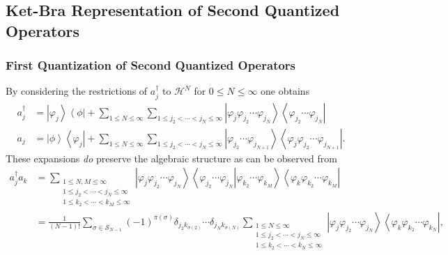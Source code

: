 \documentclass[aps,preprint]{revtex4}%
\begin{document}
\subsection{Ket-Bra Representation of Second Quantized Operators}

\subsubsection{First Quantization of Second Quantized Operators}

\bigskip By considering the restrictions of $a_{j}^{\dagger}$ to
$\mathcal{H}^{N}$ for $0\leq N\leq\infty$ one obtains%
\begin{align}
a_{j}^{\dagger}  &  =\left\vert \varphi_{j}\right\rangle \left\langle
\phi\right\vert +\sum_{1\leq N\leq\infty}\sum_{1\leq j_{2}<\cdots<j_{N}%
\leq\infty}\left\vert \varphi_{j}\varphi_{j_{2}}\cdots\varphi_{j_{N}%
}\right\rangle \left\langle \varphi_{j_{2}}\cdots\varphi_{j_{N}}\right\vert
\nonumber\\
a_{j}  &  =\left\vert \phi\right\rangle \left\langle \varphi_{j}\right\vert
+\sum_{1\leq N\leq\infty}\sum_{1\leq j_{2}<\cdots<j_{N}\leq\infty}\left\vert
\varphi_{j_{2}}\cdots\varphi_{j_{N+1}}\right\rangle \left\langle \varphi
_{j}\varphi_{j_{2}}\cdots\varphi_{j_{N+1}}\right\vert . \label{FQ}%
\end{align}
These expansions \emph{do }preserve the algebraic structure as can be observed
from%
\begin{align}
a_{j}^{\dagger}a_{k}  &  =\sum_{\substack{1\leq N,M\leq\infty\\1\leq
j_{2}<\cdots<j_{N}\leq\infty\\1\leq k_{2}<\cdots<k_{M}\leq\infty}}\left\vert
\varphi_{j}\varphi_{j_{2}}\cdots\varphi_{j_{N}}\right\rangle \left\langle
\left.  \varphi_{j_{2}}\cdots\varphi_{j_{N}}\right\vert \varphi_{k_{2}}%
\cdots\varphi_{k_{M}}\right\rangle \left\langle \varphi_{k}\varphi_{k_{2}%
}\cdots\varphi_{k_{M}}\right\vert \nonumber\\
&  =\frac{1}{\left(  N-1\right)  !}\sum_{\sigma\in\mathcal{S}_{N-1}}\left(
-1\right)  ^{\pi\left(  \sigma\right)  }\delta_{j_{2}k_{\sigma\left(
2\right)  }}\cdots\delta_{j_{N}k_{\sigma\left(  N\right)  }}\sum
_{\substack{1\leq N\leq\infty\\1\leq j_{2}<\cdots<j_{N}\leq\infty\\1\leq
k_{2}<\cdots<k_{N}\leq\infty}}\left\vert \varphi_{j}\varphi_{j_{2}}%
\cdots\varphi_{j_{N}}\right\rangle \left\langle \varphi_{k}\varphi_{k_{2}%
}\cdots\varphi_{k_{N}}\right\vert ,
\end{align}
\end{document}
